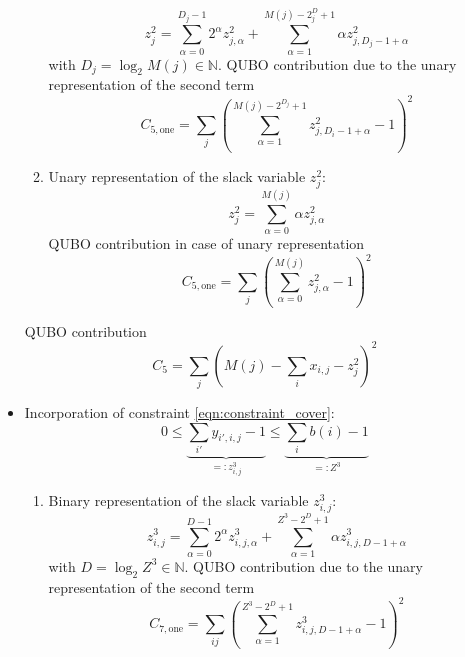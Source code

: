 \documentclass{article}
\begin{document}
\begin{itemize}
\begin{enumerate}
\begin{equation*}
            z^2_{j} = \sum_{\alpha = 0}^{D_j - 1} 2^\alpha z^2_{j, \alpha} + \sum_{\alpha=1}^{M(j) - 2^D_j + 1} \alpha z^2_{j,  D_j -1 + \alpha}
        \end{equation*}
        with $D_j = \log_2 M(j) \in \mathbb{N}$.
        QUBO contribution due to the unary representation of the second term
        \begin{equation*}
            C_{5, \text{one}} = \sum_{j} \left( \sum_{\alpha = 1}^{M(j) - 2^{D_j} + 1} z^2_{j, D_i -1 + \alpha} - 1 \right)^2
        \end{equation*}
        \item 
        Unary representation of the slack variable $z^2_j$:
        \begin{equation*}
            z^2_{j} = \sum_{\alpha = 0}^{M(j)} \alpha z^2_{j, \alpha}
        \end{equation*}
        QUBO contribution in case of unary representation
        \begin{equation*}
            C_{5, \text{one}} = \sum_{j} \left( \sum_{\alpha = 0}^{M(j)} z^2_{j, \alpha} - 1 \right)^2
        \end{equation*}
    \end{enumerate}
    QUBO contribution
    \begin{equation*}
        C_5 = \sum_j \left( M(j) - \sum_i x_{i,j} -  z^2_j \right)^2
    \end{equation*}
\item Incorporation of constraint \eqref{eqn:constraint_cover}:
    \begin{equation*}
        0 \leq \underbrace{\sum_{i'} y_{i', i, j} - 1}_{=:z^3_{i, j}} \leq \underbrace{\sum_i b(i) - 1}_{=:Z^3}
    \end{equation*}
    \begin{enumerate}
        \item 
        Binary representation of the slack variable $z^3_{i, j}$:
        \begin{equation*}
            z^3_{i, j} = \sum_{\alpha = 0}^{D - 1} 2^\alpha z^3_{i, j, \alpha} + \sum_{\alpha=1}^{Z^3 - 2^D + 1} \alpha z^3_{i, j,  D -1 + \alpha} 
        \end{equation*}
        with $D = \log_2 Z^3 \in \mathbb{N}$.
        QUBO contribution due to the unary representation of the second term
        \begin{equation*}
            C_{7, \text{one}} = \sum_{ij} \left( \sum_{\alpha = 1}^{Z^3 - 2^{D} + 1} z^3_{i, j, D - 1 + \alpha} - 1 \right)^2
        \end{equation*}

\end{enumerate}
\end{itemize}
\end{document}
